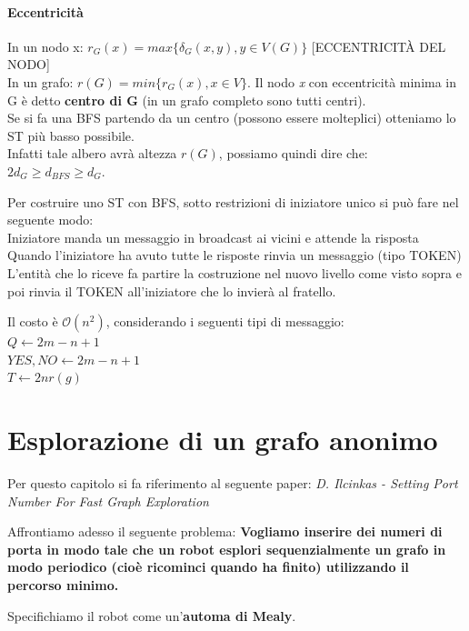 \subsubsection{Eccentricità}
In un nodo x: 
$r_G(x) = max\{ \delta_G(x,y), y \in V(G) \}$ [ECCENTRICIT\`{A} DEL NODO]\\
In un grafo: $r(G) = min \{ r_G(x), x \in V \}$. Il nodo \emph{x} con eccentricità minima in G è detto \textbf{centro di G} (in un grafo completo sono tutti centri).\\

Se si fa una BFS partendo da un centro (possono essere molteplici) otteniamo lo ST più basso possibile.\\
Infatti tale albero avrà altezza $r(G)$, possiamo quindi dire che: $2 d_G \geq d_{BFS} \geq d_G$.

Per costruire uno ST con BFS, sotto restrizioni di iniziatore unico si può fare nel seguente modo:\\
Iniziatore manda un messaggio in broadcast ai vicini e attende la risposta\\
Quando l'iniziatore ha avuto tutte le risposte rinvia un messaggio (tipo TOKEN)\\
L'entità che lo riceve fa partire la costruzione nel nuovo livello come visto sopra e poi rinvia il TOKEN all'iniziatore che lo invierà al fratello.

Il costo è $\mathcal{O}(n^2)$, considerando i seguenti tipi di messaggio:\\
$Q \leftarrow 2m - n +1$\\
$YES, NO \leftarrow 2m -n +1$\\
$T \leftarrow 2n r(g)$



\chapter{Esplorazione di un grafo anonimo}
Per questo capitolo si fa riferimento al seguente paper: \emph{D. Ilcinkas - Setting Port Number For Fast Graph Exploration}

Affrontiamo adesso il seguente problema: \textbf{Vogliamo inserire dei numeri di porta in modo tale che un robot esplori sequenzialmente un grafo in modo periodico (cioè ricominci quando ha finito) utilizzando il percorso minimo.} %

Specifichiamo il robot come un'\textbf{automa di Mealy}.

